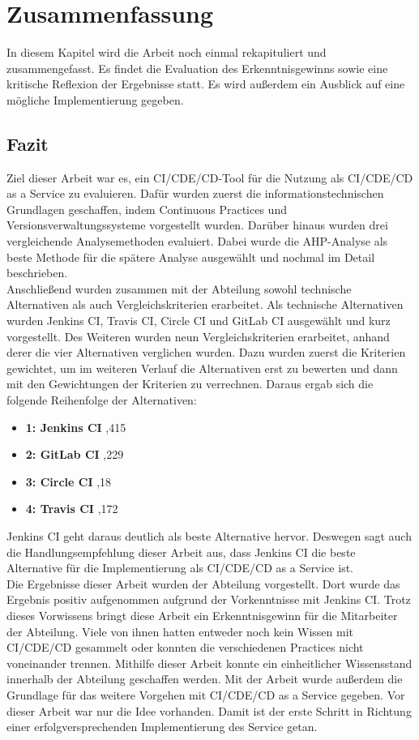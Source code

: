 \chapter{Zusammenfassung}
In diesem Kapitel wird die Arbeit noch einmal rekapituliert und zusammengefasst. Es findet die Evaluation des Erkenntnisgewinns sowie eine kritische Reflexion der Ergebnisse statt. Es wird außerdem ein Ausblick auf eine mögliche Implementierung gegeben.
\section{Fazit}
Ziel dieser Arbeit war es, ein \ac{CI}/\ac{CDE}/\ac{CD}-Tool für die Nutzung als \ac{CI}/\ac{CDE}/\ac{CD} as a Service zu evaluieren. Dafür wurden zuerst die informationstechnischen Grundlagen geschaffen, indem Continuous Practices und Versionsverwaltungssysteme vorgestellt wurden. Darüber hinaus wurden drei vergleichende Analysemethoden evaluiert. Dabei wurde die AHP-Analyse als beste Methode für die spätere Analyse ausgewählt und nochmal im Detail beschrieben.\\ Anschließend wurden zusammen mit der Abteilung sowohl technische Alternativen als auch Vergleichskriterien erarbeitet. Als technische Alternativen wurden Jenkins CI, Travis CI, Circle CI und GitLab CI ausgewählt und kurz vorgestellt. Des Weiteren wurden neun Vergleichskriterien erarbeitet, anhand derer die vier Alternativen verglichen wurden. Dazu wurden zuerst die Kriterien gewichtet, um im weiteren Verlauf die Alternativen erst zu bewerten und dann mit den Gewichtungen der Kriterien zu verrechnen. Daraus ergab sich die folgende Reihenfolge der Alternativen:
\begin{itemize}
	\item \textbf{1: Jenkins CI} \enspace\dotfill{},415\enspace\enspace\enspace
	\item \textbf{2: GitLab CI} \enspace\dotfill{},229\enspace\enspace\enspace
	\item \textbf{3: Circle CI} \enspace\dotfill{},18\enspace\enspace\enspace
	\item \textbf{4: Travis CI} \enspace\dotfill{},172\enspace\enspace\enspace
\end{itemize}
Jenkins CI geht daraus deutlich als beste Alternative hervor. Deswegen sagt auch die Handlungsempfehlung dieser Arbeit aus, dass Jenkins CI die beste Alternative für die Implementierung als \ac{CI}/\ac{CDE}/\ac{CD} as a Service ist.\\ Die Ergebnisse dieser Arbeit wurden der Abteilung vorgestellt. Dort wurde das Ergebnis positiv aufgenommen aufgrund der Vorkenntnisse mit Jenkins CI. Trotz dieses Vorwissens bringt diese Arbeit ein Erkenntnisgewinn für die Mitarbeiter der Abteilung. Viele von ihnen hatten entweder noch kein Wissen mit \ac{CI}/\ac{CDE}/\ac{CD} gesammelt oder konnten die verschiedenen Practices nicht voneinander trennen. Mithilfe dieser Arbeit konnte ein einheitlicher Wissensstand innerhalb der Abteilung geschaffen werden. Mit der Arbeit wurde außerdem die Grundlage für das weitere Vorgehen mit \ac{CI}/\ac{CDE}/\ac{CD} as a Service gegeben. Vor dieser Arbeit war nur die Idee vorhanden. Damit ist der erste Schritt in Richtung einer erfolgversprechenden Implementierung des Service getan. 
